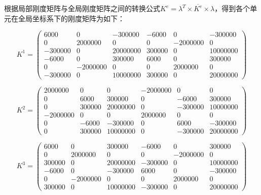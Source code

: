 \documentclass[UTF8]{ctexart}
\begin{document}
根据局部刚度矩阵与全局刚度矩阵之间的转换公式$K^e=\lambda^T \times \overline{K^e} \times \lambda$，得到各个单元在全局坐标系下的刚度矩阵为如下：

\[ K^1= \begin{pmatrix}
        6000 &           0 &     -300000  &      -6000    &        0   &   -300000 \\
           0 &     2000000     &       0   &         0   &  -2000000    &        0 \\
     -300000  &          0    & 20000000  &     300000 &          0  &   10000000 \\
       -6000  &          0     &  300000     &    6000  &          0    &   300000 \\
           0  &   -2000000    &        0    &        0    &  2000000  &          0 \\
     -300000     &       0   &  10000000      & 300000     &       0 &    20000000

\end{pmatrix} \]

\bigskip

\[ K^2= \begin{pmatrix}
     2000000    &        0  &          0 &    -2000000  &          0   &         0 \\
           0    &     6000  &     300000  &          0   &     -6000   &    300000 \\
           0    &   300000  &   20000000  &          0  &    -300000 &    10000000 \\
    -2000000     &       0   &         0   &   2000000   &         0  &          0 \\
           0     &   -6000   &   -300000   &         0  &       6000  &    -300000 \\
           0   &    300000   &  10000000   &         0  &    -300000  &   20000000

\end{pmatrix} \]

\bigskip

\[ K^3= \begin{pmatrix}
        6000   &         0     &  300000  &      -6000  &          0 &      300000 \\
           0    &  2000000   &         0  &          0  &   -2000000 &           0 \\
      300000    &        0  &   20000000  &    -300000  &          0 &    10000000 \\
       -6000   &         0    &  -300000  &       6000  &          0 &     -300000 \\
           0  &   -2000000  &          0   &         0 &     2000000 &           0 \\
      300000    &        0  &   10000000   &   -300000  &          0 &    20000000

\end{pmatrix} \]
\end{document}
